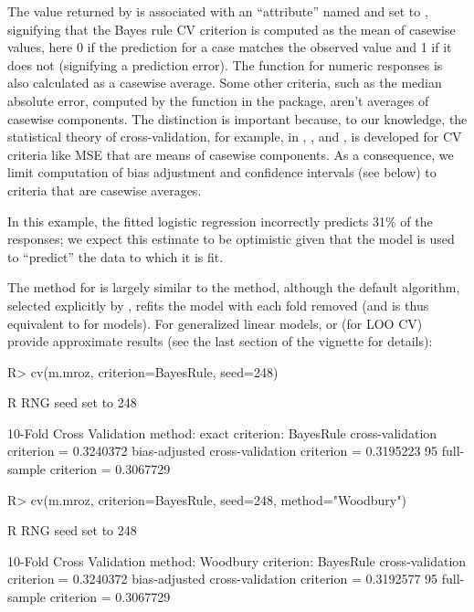 \documentclass[
]{jss}
\begin{document}
The value returned by  is associated with an
``attribute'' named  and set to
, signifying that the Bayes rule CV criterion
is computed as the mean of casewise values, here 0 if the prediction for
a case matches the observed value and 1 if it does not (signifying a
prediction error). The  function for numeric responses is
also calculated as a casewise average. Some other criteria, such as the
median absolute error, computed by the  function in
the  package, aren't averages of casewise components. The
distinction is important because, to our knowledge, the statistical
theory of cross-validation, for example, in \citet{DavisonHinkley:1997},
\citet{BatesHastieTibshirani:2023}, and \citet{ArlotCelisse:2010}, is
developed for CV criteria like MSE that are means of casewise
components. As a consequence, we limit computation of bias adjustment
and confidence intervals (see below) to criteria that are casewise
averages.

In this example, the fitted logistic regression incorrectly predicts
31\% of the responses; we expect this estimate to be optimistic given
that the model is used to ``predict'' the data to which it is fit.

The  method for  is largely similar to the
 method, although the default algorithm, selected explicitly
by , refits the model with each fold removed (and
is thus equivalent to  for  models). For
generalized linear models,  or (for LOO CV)
 provide approximate results (see the last
section of the vignette for details):

\begin{CodeChunk}
\begin{CodeInput}
R> cv(m.mroz, criterion=BayesRule, seed=248)
\end{CodeInput}
\begin{CodeOutput}
R RNG seed set to 248
\end{CodeOutput}
\begin{CodeOutput}
10-Fold Cross Validation
method: exact
criterion: BayesRule
cross-validation criterion = 0.3240372
bias-adjusted cross-validation criterion = 0.3195223
95%
full-sample criterion = 0.3067729 
\end{CodeOutput}
\begin{CodeInput}
R> cv(m.mroz, criterion=BayesRule, seed=248, method="Woodbury")
\end{CodeInput}
\begin{CodeOutput}
R RNG seed set to 248
\end{CodeOutput}
\begin{CodeOutput}
10-Fold Cross Validation
method: Woodbury
criterion: BayesRule
cross-validation criterion = 0.3240372
bias-adjusted cross-validation criterion = 0.3192577
95%
full-sample criterion = 0.3067729 
\end{CodeOutput}
\end{CodeChunk}
\end{document}
